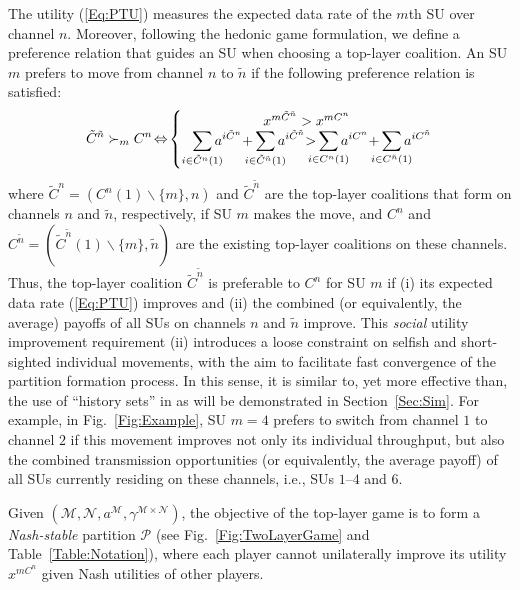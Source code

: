 \documentclass[journal,draftclsnofoot,onecolumn]{IEEEtran}
\theoremstyle{definition}
\begin{document}
The utility (\ref{Eq:PTU}) measures the expected data rate of the $m$th SU over channel $n$. Moreover, following the hedonic game formulation\cite{Hedonic}, we define a preference relation that guides an SU when choosing a top-layer coalition. An SU $m$ prefers to move from channel $n$ to $\tilde{n}$ if the following preference relation is satisfied:
\begin{equation}\label{Eq:Preference}
\begin{split}
\tilde{C}^{\tilde{n}}\succ_m C^n\!\Leftrightarrow\! \left\{\begin{matrix}
 x^{m \tilde{C}^{\tilde{n}}}>x^{m C^n} \\ 
  \smashoperator[r]{\sum_{ i{\in}  \tilde{C}^n(1)}}a^{i{ \tilde{C}^n}}{+}\smashoperator{\sum_{i\in \tilde{C}^{\tilde{n}}(1)}}a^{i \tilde{C}^{\tilde{n}}}{ >}\smashoperator{\sum_{i\in C^n(1)}}a^{iC^n}{+}\smashoperator{\sum_{i\in C^{\tilde{n}}(1)}}a^{iC^{\tilde{n}}}
\end{matrix}\right.\raisetag{2.8\baselineskip}
\end{split}
\end{equation}
where $\tilde{C}^n{=}(C^n(1)\backslash \{m\},n)$ and $\tilde{C}^{\tilde{n}}$ are the top-layer coalitions that form on channels $n$ and $\tilde{n}$, respectively, if SU $m$ makes the move, and $C^n$ and $C^{\tilde{n}}{=}(\tilde{C}^{\tilde{n}}(1)\backslash\{m\},\tilde{n})$ are the existing top-layer coalitions on these channels. Thus, the top-layer coalition $\tilde{C}^{\tilde{n}}$ is preferable to $C^n$ for SU $m$ if (i) its expected data rate (\ref{Eq:PTU}) improves and (ii) the combined (or equivalently, the average) payoffs of all SUs on channels $n$ and $\tilde{n}$ improve. This \emph{social} utility improvement requirement (ii) introduces a loose constraint on selfish and short-sighted individual movements, with the aim to facilitate fast convergence of the partition formation process. In this sense, it is similar to, yet more effective than, the use of ``history sets'' in \cite{HedonicSenseGame} as will be demonstrated in Section~\ref{Sec:Sim}. For example, in Fig.~\ref{Fig:Example}, SU $m=4$ prefers to switch from channel $1$ to channel $2$ if this movement improves not only its individual throughput, but also the combined transmission opportunities (or equivalently, the average payoff) of all SUs currently residing on these channels, i.e., SUs $1$--$4$ and $6$.

Given $(\mathcal{M},\mathcal{N},a^{\mathcal{M}}, \gamma^{\mathcal{M}\times \mathcal{N}})$, the objective of the top-layer game is to form a \emph{Nash-stable} \cite{Hedonic} partition $\mathcal{P}$ (see Fig.~\ref{Fig:TwoLayerGame} and Table~\ref{Table:Notation}), where each player cannot unilaterally improve its utility $x^{m C^n}$ given Nash utilities of other players.
\end{document}
